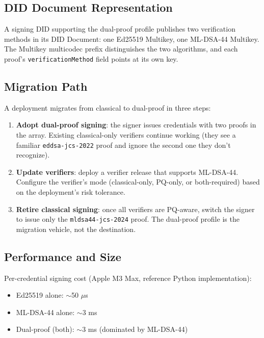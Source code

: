 \documentclass[11pt,a4paper]{article}
\begin{document}
\subsection{DID Document Representation}

A signing DID supporting the dual-proof profile publishes two verification methods in its DID Document: one Ed25519 Multikey, one ML-DSA-44 Multikey. The Multikey multicodec prefix distinguishes the two algorithms, and each proof's \verb|verificationMethod| field points at its own key.

\subsection{Migration Path}

A deployment migrates from classical to dual-proof in three steps:

\begin{enumerate}[label=\arabic*.,leftmargin=*]
\item \textbf{Adopt dual-proof signing}: the signer issues credentials with two proofs in the array. Existing classical-only verifiers continue working (they see a familiar \texttt{eddsa-jcs-2022} proof and ignore the second one they don't recognize).
\item \textbf{Update verifiers}: deploy a verifier release that supports ML-DSA-44. Configure the verifier's mode (classical-only, PQ-only, or both-required) based on the deployment's risk tolerance.
\item \textbf{Retire classical signing}: once all verifiers are PQ-aware, switch the signer to issue only the \texttt{mldsa44-jcs-2024} proof. The dual-proof profile is the migration vehicle, not the destination.
\end{enumerate}

\subsection{Performance and Size}

Per-credential signing cost (Apple M3 Max, reference Python implementation):

\begin{itemize}[leftmargin=*]
\item Ed25519 alone: $\sim$50 $\mu$s
\item ML-DSA-44 alone: $\sim$3 ms
\item Dual-proof (both): $\sim$3 ms (dominated by ML-DSA-44)
\end{itemize}
\end{document}
